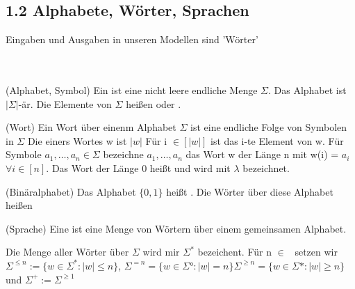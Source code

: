 \documentclass[a4paper]{article}
\begin{document}
\subsection{1.2 Alphabete, Wörter, Sprachen}
Eingaben und Ausgaben in unseren Modellen sind 'Wörter' \\
\\
\
\begin{DefBox}{(Alphabet, Symbol)}
Ein  ist eine nicht leere endliche Menge $\Sigma$. Das Alphabet ist $|\Sigma|$-är. Die Elemente von $\Sigma$ heißen  oder .
\end{DefBox}

\begin{DefBox}{(Wort)}
Ein Wort über einenm Alphabet $\Sigma$ ist eine endliche Folge von Symbolen in $\Sigma$ Die  einers Wortes w ist $|w|$ Für i $\in [|w|]$ ist  das i-te Element von w. Für Symbole $a_1,\dots,a_n \in \Sigma$ bezeichne $a_1,\dots,a_n$ das Wort w der Länge n mit w(i) = $a_i$ $\forall i \in [n].$ Das Wort der Länge 0 heißt  und wird mit $\lambda$ bezeichnet.
\end{DefBox}

\begin{DefBox}{(Binäralphabet)}
Das Alphabet $\lbrace 0,1 \rbrace$ heißt . Die Wörter über diese Alphabet heißen 
\end{DefBox}

\begin{DefBox}{(Sprache)}
Eine  ist eine Menge von Wörtern über einem gemeinsamen Alphabet.
\end{DefBox}

\begin{DefBox}{}
Die Menge aller Wörter über $\Sigma$ wird mir $\Sigma^*$ bezeichent. Für n $\in$ \NN \ setzen wir $\Sigma^{\leq n} := \lbrace w \in \Sigma^* : |w| \leq n \rbrace$, $\Sigma^{=n} = \lbrace w \in \Sigma° : |w| = n \rbrace \Sigma^{\geq n} = \lbrace w \in \Sigma* : |w| \geq n \rbrace$ und $ \Sigma^+ := \Sigma^{\geq 1}$
\end{DefBox}
\end{document}
